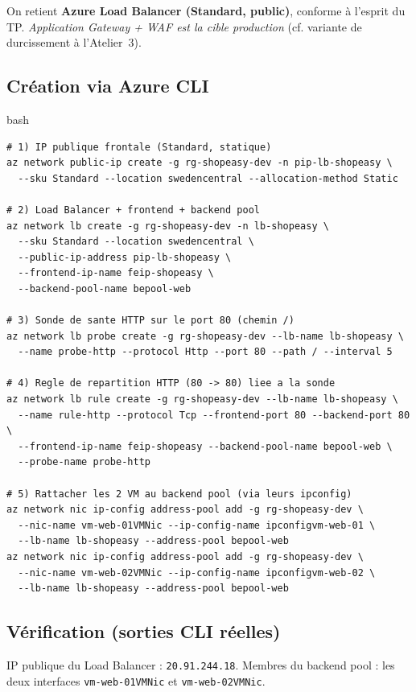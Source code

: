\documentclass[11pt,a4paper]{article}
\begin{document}
\noindent On retient \textbf{Azure Load Balancer (Standard, public)}, conforme à l'esprit du TP.
\textit{Application Gateway + WAF est la cible production} (cf. variante de durcissement à l'Atelier~3).

\subsection{Création via Azure CLI}
\begin{codebox}{bash}
\begin{Verbatim}
# 1) IP publique frontale (Standard, statique)
az network public-ip create -g rg-shopeasy-dev -n pip-lb-shopeasy \
  --sku Standard --location swedencentral --allocation-method Static

# 2) Load Balancer + frontend + backend pool
az network lb create -g rg-shopeasy-dev -n lb-shopeasy \
  --sku Standard --location swedencentral \
  --public-ip-address pip-lb-shopeasy \
  --frontend-ip-name feip-shopeasy \
  --backend-pool-name bepool-web

# 3) Sonde de sante HTTP sur le port 80 (chemin /)
az network lb probe create -g rg-shopeasy-dev --lb-name lb-shopeasy \
  --name probe-http --protocol Http --port 80 --path / --interval 5

# 4) Regle de repartition HTTP (80 -> 80) liee a la sonde
az network lb rule create -g rg-shopeasy-dev --lb-name lb-shopeasy \
  --name rule-http --protocol Tcp --frontend-port 80 --backend-port 80 \
  --frontend-ip-name feip-shopeasy --backend-pool-name bepool-web \
  --probe-name probe-http

# 5) Rattacher les 2 VM au backend pool (via leurs ipconfig)
az network nic ip-config address-pool add -g rg-shopeasy-dev \
  --nic-name vm-web-01VMNic --ip-config-name ipconfigvm-web-01 \
  --lb-name lb-shopeasy --address-pool bepool-web
az network nic ip-config address-pool add -g rg-shopeasy-dev \
  --nic-name vm-web-02VMNic --ip-config-name ipconfigvm-web-02 \
  --lb-name lb-shopeasy --address-pool bepool-web
\end{Verbatim}
\end{codebox}

\subsection{Vérification (sorties CLI réelles)}
\noindent IP publique du Load Balancer : \texttt{20.91.244.18}. Membres du backend pool : les deux interfaces
\texttt{vm-web-01VMNic} et \texttt{vm-web-02VMNic}.
\end{document}
